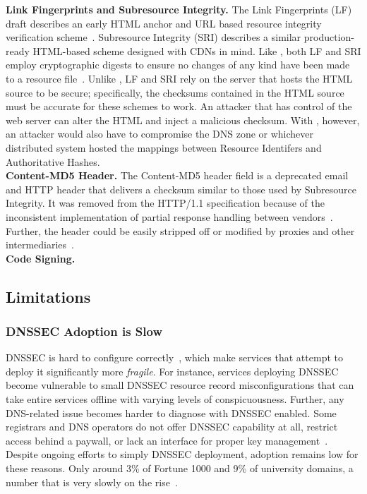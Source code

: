 \noindent\textbf{Link Fingerprints and Subresource Integrity.} The Link
Fingerprints (LF) draft describes an early HTML anchor and URL based resource
integrity verification scheme~\cite{LF}. Subresource Integrity (SRI) describes a
similar production-ready HTML-based scheme designed with CDNs in mind. Like
\SYSTEM{}, both LF and SRI employ cryptographic digests to ensure no changes of
any kind have been made to a resource file~\cite{SRI}. Unlike \SYSTEM{}, LF and
SRI rely on the server that hosts the HTML source to be secure; specifically,
the checksums contained in the HTML source must be accurate for these schemes to
work. An attacker that has control of the web server can alter the HTML and
inject a malicious checksum. With \SYSTEM{}, however, an attacker would also
have to compromise the DNS zone or whichever distributed system hosted the
mappings between Resource Identifers and Authoritative Hashes. \\

\noindent\textbf{Content-MD5 Header.} The Content-MD5 header field is a
deprecated email and HTTP header that delivers a checksum similar to those used
by Subresource Integrity. It was removed from the HTTP/1.1 specification because
of the inconsistent implementation of partial response handling between
vendors~\cite{HTTP1.1}. Further, the header could be easily stripped off or
modified by proxies and other intermediaries~\cite{MD5Header}. \\

\noindent\textbf{Code Signing.} 

\subsection{Limitations}

\subsubsection{DNSSEC Adoption is Slow}

DNSSEC is hard to configure correctly~\cite{DNSSEC-is-hard-1, DNSSEC-is-hard-2,
DNSSEC-is-hard-3, DNSSEC-is-hard-4}, which make services that attempt to deploy
it significantly more \textit{fragile}. For instance, services deploying DNSSEC
become vulnerable to small DNSSEC resource record misconfigurations that can
take entire services offline with varying levels of conspicuousness. Further,
any DNS-related issue becomes harder to diagnose with DNSSEC enabled. Some
registrars and DNS operators do not offer DNSSEC capability at all, restrict
access behind a paywall, or lack an interface for proper key
management~\cite{Cloudflare}. Despite ongoing efforts to simply DNSSEC
deployment, adoption remains low for these reasons. Only around 3\% of Fortune
1000 and 9\% of university domains, a number that is very slowly on the
rise~\cite{NIST}.

